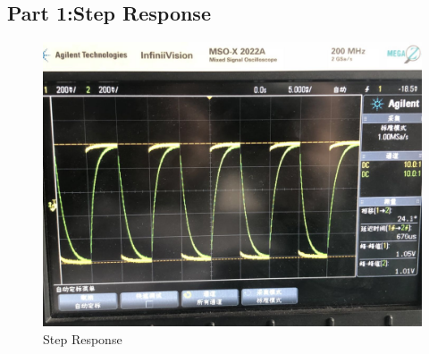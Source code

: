\documentclass[12pt]{article}
\begin{document}
\subsection{Part 1:Step Response}
\begin{figure}[H]
\centering
\includegraphics[scale=0.2]{p2.jpg}
\caption{Step Response}
\end{figure}
\end{document}

